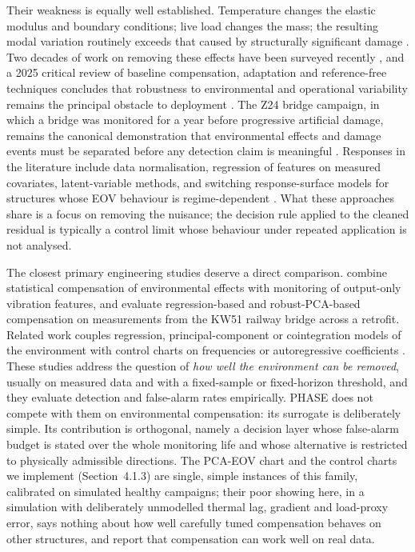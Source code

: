 \documentclass[12pt,a4paper]{article}
\newenvironment{revblock}{}{}
\newenvironment{revblock}{\begingroup\color{revcol}}{\endgroup}
\begin{document}
Their weakness is equally well established. Temperature changes the elastic modulus and boundary conditions; live load changes the mass; the resulting modal variation routinely exceeds that caused by structurally significant damage \citep{sohn1999alamosa,sohn2007eov}. Two decades of work on removing these effects have been surveyed recently \citep{wang2022eliminating,han2021temperature}, and a 2025 critical review of baseline compensation, adaptation and reference-free techniques concludes that robustness to environmental and operational variability remains the principal obstacle to deployment \citep{rezazadeh2025eov}. The Z24 bridge campaign, in which a bridge was monitored for a year before progressive artificial damage, remains the canonical demonstration that environmental effects and damage events must be separated before any detection claim is meaningful \citep{peeters2001z24}. Responses in the literature include data normalisation, regression of features on measured covariates, latent-variable methods, and switching response-surface models for structures whose EOV behaviour is regime-dependent \citep{worden2018switching}. What these approaches share is a focus on removing the nuisance; the decision rule applied to the cleaned residual is typically a control limit whose behaviour under repeated application is not analysed.

\begin{revblock}
The closest primary engineering studies deserve a direct comparison. \citet{deraemaeker2008output} combine statistical compensation of environmental effects with monitoring of output-only vibration features, and \citet{maes2022kw51} evaluate regression-based and robust-PCA-based compensation on measurements from the KW51 railway bridge across a retrofit. Related work couples regression, principal-component or cointegration models of the environment with control charts on frequencies or autoregressive coefficients \citep{fugate2001spc,kullaa2003z24,yan2005pca,magalhaes2012arch,cross2011cointegration}. These studies address the question of \emph{how well the environment can be removed}, usually on measured data and with a fixed-sample or fixed-horizon threshold, and they evaluate detection and false-alarm rates empirically. PHASE does not compete with them on environmental compensation: its surrogate is deliberately simple. Its contribution is orthogonal, namely a decision layer whose false-alarm budget is stated over the whole monitoring life and whose alternative is restricted to physically admissible directions. The PCA-EOV chart and the control charts we implement (Section~4.1.3) are single, simple instances of this family, calibrated on simulated healthy campaigns; their poor showing here, in a simulation with deliberately unmodelled thermal lag, gradient and load-proxy error, says nothing about how well carefully tuned compensation behaves on other structures, and \citet{maes2022kw51} report that compensation can work well on real data.
\end{revblock}
\end{document}
